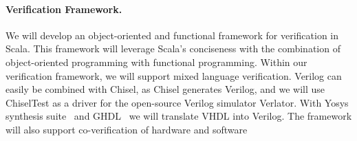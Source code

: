\documentclass[fleqn,12pt]{article}
\begin{document}
\paragraph{Verification Framework.}

We will develop an object-oriented and functional framework for verification in Scala.
This framework will leverage Scala's conciseness with the
combination of object-oriented programming with functional programming.
Within our verification framework, we will support mixed language verification.
Verilog can easily be combined with Chisel, as Chisel generates Verilog, and
we will use ChiselTest as a driver for the open-source Verilog simulator Verlator.
With Yosys synthesis suite~\cite{Yosys} and GHDL~\cite{ghdl}
we will translate VHDL into Verilog.
The framework will also support co-verification of hardware and software

%
%
%
\end{document}
